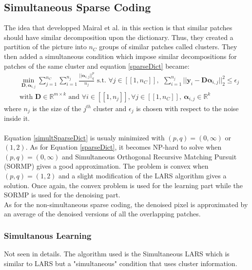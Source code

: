 \documentclass{ipol}
\newcommand{\psize}{m}
\newcommand{\dsize}{k}
\newcommand{\dict}{\textbf{D}}
\newcommand{\code}{\bm{\alpha}}
\newcommand{\pnorm}{p}
\newcommand{\qnorm}{q}
\newcommand{\nclust}{n_C}
\newcommand{\noi}{\textbf{y}}
\newcommand{\RR}{\mathbb{R}}
\begin{document}
\subsection{Simultaneous Sparse Coding}

The idea that developped Mairal et al. in this section is that similar patches should have similar decomposition upon the dictionary. Thus, they created a partition of the picture into $\nclust$ groups of similar patches called clusters. They then added a simultaneous condition which impose similar decompositions for patches of the same cluster and equation \eqref{sparseDict} became:
\begin{equation}
\begin{split}
	&\min_{\dict, \code_{i,j}} \sum_{j=1}^{\nclust} \sum_{i=1}^{n_j} \frac{||\code_{i,j}||^\pnorm_\qnorm}{n_j} \text{ s.t. } \forall j \in [\![1, \nclust]\!],\ \ \sum_{i=1}^{n_j}||\noi_i  - \dict \code_{i,j}||^2_2 \leqslant \epsilon_j \\
	& \text{with } \dict \in \RR^{\psize \times \dsize} \text{ and } \forall i \in [\![1,n_j]\!], \forall j \in [\![1, \nclust]\!], \ \code_{i,j} \in \RR^\dsize
	\label{simultSparseDict}
\end{split}
\end{equation}
where $n_j$ is the size of the $j^{th}$ cluster and $\epsilon_j$ is chosen with respect to the noise inside it.\\
\\
Equation \eqref{simultSparseDict} is usualy minimized with $(\pnorm, \qnorm) = (0, \infty)$ or $(1, 2)$. As for Equation \eqref{sparseDict}, it becomes NP-hard to solve when $(\pnorm, \qnorm)=(0, \infty)$ and Simultaneous Orthogonal Recursive Matching Pursuit (SORMP) \cite{SOMP} gives a good approximation. The problem is convex when $(\pnorm, \qnorm)=(1, 2)$ and a slight modification of the LARS algorithm gives a solution. Once again, the convex problem is used for the learning part while the SORMP is used for the denoising part.\\
As for the non-simultaneous sparse coding, the denoised pixel is approximated by an average of the denoised versions of all the overlapping patches.

\subsubsection{Simultanous Learning}

Not seen in details. The algorithm used is the Simultaneous LARS which is similar to LARS but a "simultaneous" condition that uses cluster information.
\end{document}
